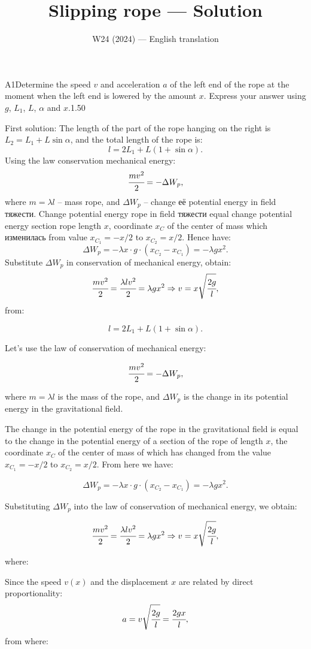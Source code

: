 \documentclass[11pt,a4paper]{article}
\title{\textbf{Slipping rope --- Solution}}
\author{\normalsize W24 (2024) — English translation}
\date{}
\begin{document}
\maketitle\vspace{-0.5em}
\begin{solcard}{A1}{Determine the speed $v$ and acceleration $a$ of the left end of the rope at the moment when the left end is lowered by the amount $x$. Express your answer using $g$, $L_1$, $L$, $\alpha$ and $x$.}{1.50}

First solution: The length of the part of the rope hanging on the right is $L_2=L_1+L\sin\alpha$, and the total length of the rope is: $$l=2L_1+L(1+\sin\alpha){.} $$ Using the law conservation mechanical energy: $$\cfrac{mv^2}{2}=-\Delta{W}_p{,}$$ where $m=\lambda l$ – mass rope, and $\Delta{W}_p$ – change её potential energy in field тяжести. Change potential energy rope in field тяжести equal change potential energy section rope length $x$, coordinate $x_C$ of the center of mass which изменилась from value $x_{C_1}=-x/2$ to $ x_{C_2}=x/2$. Hence have: $$\Delta{W}_p=-\lambda x\cdot g\cdot(x_{C_2}-x_{C_1})=-\lambda gx^2{.} $$ Substitute $\Delta{W}_p$ in conservation of mechanical energy, obtain: $$\cfrac{mv^2}{2}=\cfrac{\lambda lv^2}{2}=\lambda gx^2\Rightarrow v=x\sqrt{\cfrac{2g}{l}}{,} $$ from:


$$l=2L_1+L(1+\sin\alpha){.} $$


Let's use the law of conservation of mechanical energy:


$$\cfrac{mv^2}{2}=-\Delta{W}_p{,}$$


where $m=\lambda l$ is the mass of the rope, and $\Delta{W}_p$ is the change in its potential energy in the gravitational field.


The change in the potential energy of the rope in the gravitational field is equal to the change in the potential energy of a section of the rope of length $x$, the coordinate $x_C$ of the center of mass of which has changed from the value $x_{C_1}=-x/2$ to $x_{C_2}=x/2$. From here we have:


$$\Delta{W}_p=-\lambda x\cdot g\cdot(x_{C_2}-x_{C_1})=-\lambda gx^2{.} $$


Substituting $\Delta{W}_p$ into the law of conservation of mechanical energy, we obtain:


$$\cfrac{mv^2}{2}=\cfrac{\lambda lv^2}{2}=\lambda gx^2\Rightarrow v=x\sqrt{\cfrac{2g}{l}}{,} $$


where:


Since the speed $v(x)$ and the displacement $x$ are related by direct proportionality: $$a=v\sqrt{\cfrac{2g}{l}}=\cfrac{2gx}{l}{,} $$from where:



\end{solcard}
\end{document}
